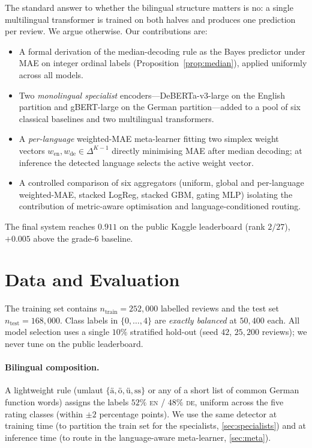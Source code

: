 \documentclass{article}
\theoremstyle{plain}
\begin{document}
The standard answer to whether the bilingual structure matters is no:
a single multilingual transformer is trained on both halves and
produces one prediction per review. We argue otherwise. Our
contributions are:
\begin{itemize}[leftmargin=*,topsep=2pt,itemsep=0pt]
\item A formal derivation of the median-decoding rule as the Bayes
predictor under MAE on integer ordinal labels
(Proposition~\ref{prop:median}), applied uniformly across all models.
\item Two \emph{monolingual specialist} encoders---DeBERTa-v3-large
\cite{he2023debertav3} on the English partition and gBERT-large
\cite{chan2020gbert} on the German partition---added to a pool of six
classical baselines and two multilingual transformers.
\item A \emph{per-language} weighted-MAE meta-learner fitting two
simplex weight vectors $w_{\mathrm{en}},w_{\mathrm{de}}\in\Delta^{K-1}$
directly minimising MAE after median decoding; at inference the
detected language selects the active weight vector.
\item A controlled comparison of six aggregators (uniform, global and
per-language weighted-MAE, stacked LogReg, stacked GBM, gating MLP)
isolating the contribution of metric-aware optimisation and
language-conditioned routing.
\end{itemize}
The final system reaches $0.911$ on the public Kaggle leaderboard
(rank $2/27$), $+0.005$ above the grade-6 baseline.

\section{Data and Evaluation}
\label{sec:data}

The training set contains $n_{\text{train}}=252{,}000$ labelled reviews
and the test set $n_{\text{test}}=168{,}000$. Class labels in
$\{0,\dots,4\}$ are \emph{exactly balanced} at $50{,}400$ each. All
model selection uses a single $10\%$ stratified hold-out (seed $42$,
$25{,}200$ reviews); we never tune on the public leaderboard.

\paragraph{Bilingual composition.}
A lightweight rule (umlaut
$\{\text{\"a},\text{\"o},\text{\"u},\text{ss}\}$ or any of a short
list of common German function words) assigns the labels $52\%$
\textsc{en} / $48\%$ \textsc{de}, uniform across the five rating
classes (within $\pm 2$ percentage points). We use the same detector
at training time (to partition the train set for the specialists,
\cref{sec:specialists}) and at inference time (to route in the
language-aware meta-learner, \cref{sec:meta}).
\end{document}
